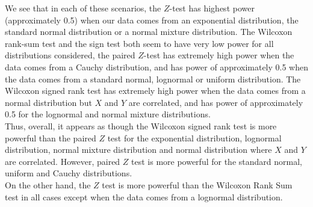 \documentclass[11pt]{article}
\begin{document}
\noindent We see that in each of these scenarios, the $Z$-test has highest power (approximately 0.5) when our data comes from an exponential distribution, the standard normal distribution or a normal mixture distribution. The Wilcoxon rank-sum test and the sign test both seem to have very low power for all distributions considered, the paired $Z$-test has extremely high power when the data comes from a Cauchy distribution, and  has power of approximately 0.5 when the data comes from a standard normal, lognormal or uniform distribution. The Wilcoxon signed rank test has extremely high power when the data comes from a normal distribution but $X$ and $Y$ are correlated, and has power of approximately 0.5 for the lognormal and normal mixture distributions.\\
Thus, overall, it appears as though the Wilcoxon signed rank test is more powerful than the paired $Z$ test for the exponential distribution, lognormal distribution, normal mixture distribution and normal distribution where $X$ and $Y$ are correlated. However, paired $Z$ test is more powerful for the standard normal, uniform and Cauchy distributions.\\
On the other hand, the $Z$ test is more powerful than the Wilcoxon Rank Sum test in all cases except when the data comes from a lognormal distribution.
\end{document}
